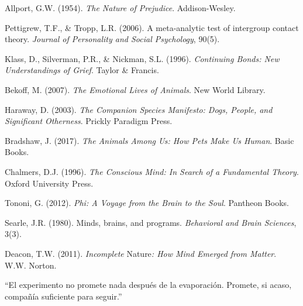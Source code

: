  Allport, G.W. (1954). \emph{The Nature of Prejudice}. Addison-Wesley.

 Pettigrew, T.F., \& Tropp, L.R. (2006). A meta-analytic test of intergroup contact theory. \emph{Journal of Personality and Social Psychology}, 90(5).

 Klass, D., Silverman, P.R., \& Nickman, S.L. (1996). \emph{Continuing Bonds: New Understandings of Grief}. Taylor \& Francis.

 Bekoff, M. (2007). \emph{The Emotional Lives of Animals}. New World Library.

 Haraway, D. (2003). \emph{The Companion Species Manifesto: Dogs, People, and Significant Otherness}. Prickly Paradigm Press.

 Bradshaw, J. (2017). \emph{The Animals Among Us: How Pets Make Us Human}. Basic Books.

 Chalmers, D.J. (1996). \emph{The Conscious Mind: In Search of a Fundamental Theory}. Oxford University Press.

 Tononi, G. (2012). \emph{Phi: A Voyage from the Brain to the Soul}. Pantheon Books.

 Searle, J.R. (1980). Minds, brains, and programs. \emph{Behavioral and Brain Sciences}, 3(3).

 Deacon, T.W. (2011). \emph{Incomplete} Nature\emph{: How Mind Emerged from Matter}. W.W. Norton.

\findelexperimento
\begin{cita}\centering
“El experimento no promete nada después de la evaporación. Promete, si acaso, compañía suficiente para seguir.”
\end{cita}
